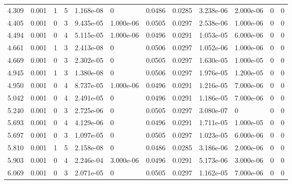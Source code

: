 \documentclass[preview]{standalone}
\begin{document}
{{\begin{tabular}{L{1.2cm}C{1.2cm} C{0.3cm}C{0.5cm} C{1.4cm}C{1.4cm} C{1.4cm}C{1.4cm} C{1.6cm}C{1.6cm} C{1.6cm}C{1.6cm}}
  4.309  &  0.001  & 1     &  5 &  1.168e-08  & 0  &  0.0486&   0.0285& 3.238e-06 & 2.000e-06   &  0 & 0  \\ 
  4.405  &  0.001  & 0     &  3 &  9.435e-05  & 1.000e-06  &  0.0505&   0.0297& 2.538e-06 & 1.000e-06   &  0 & 0  \\ 
  4.494  &  0.001  & 0     &  4 &  5.115e-05  & 1.000e-06  &  0.0496&   0.0291& 1.053e-05 & 6.000e-06   &  0 & 0  \\ 
  4.661  &  0.001  & 1     &  3 &  2.413e-08  & 0  &  0.0506&   0.0297& 1.052e-06 & 1.000e-06   &  0 & 0  \\ 
  4.669  &  0.001  & 0     &  3 &  2.302e-05  & 0  &  0.0505&   0.0297& 1.630e-05 & 1.000e-05   &  0 & 0  \\ 
  4.945  &  0.001  & 1     &  3 &  1.380e-08  & 0  &  0.0506&   0.0297& 1.976e-05 & 1.200e-05   &  0 & 0  \\ 
  4.950  &  0.001  & 0     &  4 &  8.737e-05  & 1.000e-06  &  0.0496&   0.0291& 1.216e-05 & 7.000e-06   &  0 & 0  \\ 
  5.042  &  0.001  & 0     &  4 &  2.491e-05  & 0  &  0.0496&   0.0291& 1.186e-05 & 7.000e-06   &  0 & 0  \\ 
  5.240  &  0.001  & 0     &  3 &  2.725e-06  & 0  &  0.0505&   0.0297& 3.080e-07 & 0   &  0 & 0  \\ 
  5.693  &  0.001  & 0     &  4 &  4.129e-06  & 0  &  0.0496&   0.0291& 1.711e-05 & 1.000e-05   &  0 & 0  \\ 
  5.697  &  0.001  & 0     &  3 &  1.097e-05  & 0  &  0.0505&   0.0297& 1.023e-05 & 6.000e-06   &  0 & 0  \\ 
  5.810  &  0.001  & 1     &  5 &  2.158e-08  & 0  &  0.0486&   0.0285& 3.186e-06 & 2.000e-06   &  0 & 0  \\ 
  5.903  &  0.001  & 0     &  4 &  2.246e-04  & 3.000e-06  &  0.0496&   0.0291& 5.173e-06 & 3.000e-06   &  0 & 0  \\ 
  6.069  &  0.001  & 0     &  3 &  2.071e-05  & 0  &  0.0505&   0.0297& 1.162e-05 & 7.000e-06   &  0 & 0  \\ 
\hline 
\end{tabular} 

}}
\end{document}
